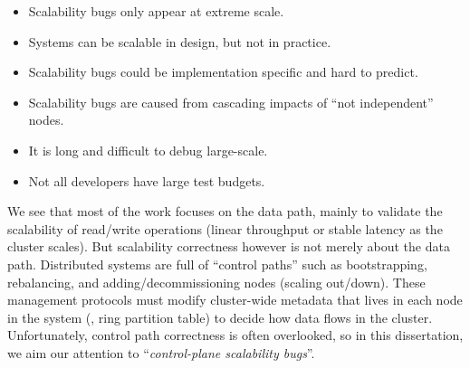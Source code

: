 \begin{itemize}
\item Scalability bugs only appear at extreme scale.
\item Systems can be scalable in design, but not in practice.
\item Scalability bugs could be implementation specific and hard to predict.
\item Scalability bugs are caused from cascading impacts of ``not independent'' nodes.
\item It is long and difficult to debug large-scale.
\item Not all developers have large test budgets.
\end{itemize}



We see that most of the work \cite{Calotoiu+13-ApmScaleBug,
Laguna+15-DebugAtScale, Shudler+15-ExascaleLib, Wang+14-Exalt, Zhou+11-Vrisha,
Zhou+13-Wukong} focuses on the data path, mainly to validate the scalability of
read/write operations (linear throughput or stable latency as the cluster
scales). But scalability correctness however is not merely about the data path.
Distributed systems are full of ``control paths'' such as bootstrapping,
rebalancing, and adding/decommissioning nodes (scaling out/down). These
management protocols must modify cluster-wide metadata that lives in each node
in the system (\eg, ring partition table) to decide how data flows in the
cluster. Unfortunately, control path correctness is often overlooked, so in this
dissertation, we aim our attention to ``{\em control-plane scalability bugs}''.
\fi
